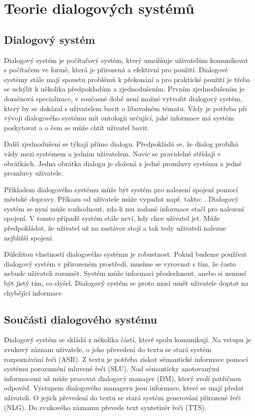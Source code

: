 \chapter{Teorie dialogových systémů}

\section{Dialogový systém}

Dialogový systém je počítačový systém, který umožňuje uživatelům komunikovat s počítačem ve formě, která je přirozená a efektivní pro použití. 
Dialogové systémy stále mají spoustu problémů k překonání a pro praktické použití je třeba se uchýlit k několika předpokladům a zjednodušením.
Prvním zjednodušením je doménová specializace, v současné době není možné vytvořit dialogový systém, který by se dokázal s uživatelem bavit o libovolném tématu. 
Vždy je potřeba při vývoji dialogového systému mít ontologii určující, jaké informace má systém poskytovat a o čem se může chtít uživatel bavit.

Další zjednodušení se týkají přímo dialogu. 
Předpokládá se, že dialog probíhá vždy mezi systémem a jedním uživatelem. 
Navíc se pravidelně střídají v obrátkách.
Jedna obrátka dialogu je složená z jedné promluvy systému a jedné promluvy uživatele.

Příkladem dialogového systému může být systém pro nalezení spojení pomocí
městské dopravy. Příkazu od uživatele může vypadat např. takto: . Dialogový systém se nyní může rozhodnout,
zda-li mu zadané informace stačí pro nalezení spojení. V tomto případě systém
stále neví, kdy chce uživatel jet. Může předpokládat, že uživatel už na
zastávce stojí a tak tedy uživateli nalezne nejbližší spojení.

Důležitou vlastností dialogového systému je robustnost. Pokud budeme používat
dialogový systém v přirozeném prostředí, musíme se vyrovnat s tím, že často
nebude uživateli rozumět. 
Systém může informaci přeslechnout, anebo si nemusí být jistý tím, co slyšel.
Dialogový systém se proto musí umět uživatele doptat na chybějící informace


\section{Součásti dialogového systému}

Dialogový systém se skládá z několika částí, které spolu komunikují.
Na vstupu je zvukový záznam uživatele, o jeho převedení do textu se stará systém rozpoznávání řeči (ASR).
Z textu je potřeba získat sémantické informace pomocí systému porozumění mluvené řeči (SLU).
Nad sémanticky anotovanými informacemi už může pracovat dialogový manager (DM), který zvolí patřičnou odpověď.
Výstupem dialogového manageru jsou informace, které se mají předat uživateli.
O jejich převedení do textu se stará systém generování přirozené řeči (NLG).
Do zvukového záznamu převede text syntetizér řeči (TTS).

